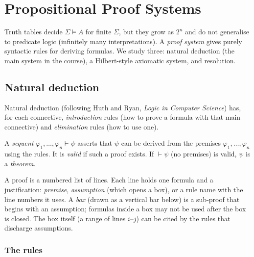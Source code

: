 \chapter{Propositional Proof Systems}\label{ch:propproofs}

Truth tables decide $\Sigma\models A$ for finite $\Sigma$, but they grow as $2^n$ and do not
generalise to predicate logic (infinitely many interpretations). A \emph{proof system}
gives purely syntactic rules for deriving formulas. We study three: natural deduction
(the main system in the course), a Hilbert-style axiomatic system, and resolution.

\section{Natural deduction}

Natural deduction (following Huth and Ryan, \emph{Logic in Computer Science}) has, for
each connective, \emph{introduction} rules (how to prove a formula with that main
connective) and \emph{elimination} rules (how to use one).

\begin{definition}[Sequent]
A \emph{sequent} $\varphi_1,\dots,\varphi_n\vdash\psi$ asserts that $\psi$ can be derived
from the premises $\varphi_1,\dots,\varphi_n$ using the rules. It is \emph{valid} if such a
proof exists. If $\vdash\psi$ (no premises) is valid, $\psi$ is a \emph{theorem}.
\end{definition}

A proof is a numbered list of lines. Each line holds one formula and a justification:
\emph{premise}, \emph{assumption} (which opens a box), or a rule name with the line numbers
it uses. A \emph{box} (drawn as a vertical bar below) is a sub-proof that begins with an
assumption; formulas inside a box may not be used after the box is closed. The box
itself (a range of lines $i$--$j$) can be cited by the rules that discharge assumptions.

\subsection{The rules}

